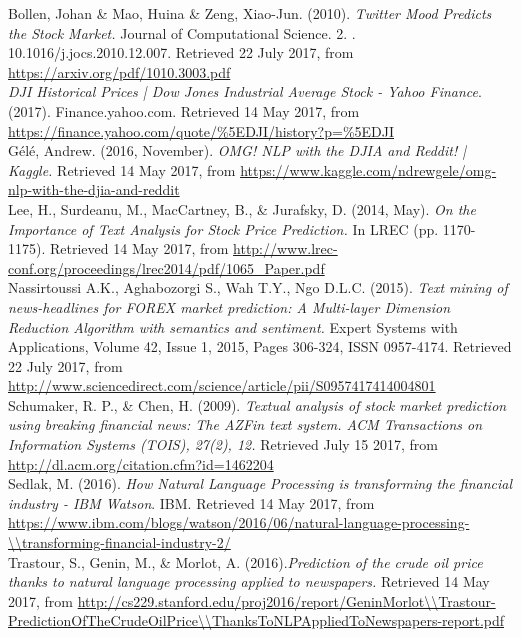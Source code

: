 \documentclass[11pt,a4paper]{article}
\begin{document}
Bollen, Johan \& Mao, Huina \& Zeng, Xiao-Jun. (2010). \textit{Twitter Mood Predicts the Stock Market.} Journal of Computational Science. 2. . 10.1016/j.jocs.2010.12.007. Retrieved 22 July 2017, from \url{https://arxiv.org/pdf/1010.3003.pdf}\\


\textit{DJI Historical Prices | Dow Jones Industrial Average Stock - Yahoo Finance}. (2017). Finance.yahoo.com. Retrieved 14 May 2017, from \url{https://finance.yahoo.com/quote/\%5EDJI/history?p=\%5EDJI}\\

G\'el\'e, Andrew. (2016, November). \textit{OMG! NLP with the DJIA and Reddit! | Kaggle.} Retrieved 14 May 2017, from \url{https://www.kaggle.com/ndrewgele/omg-nlp-with-the-djia-and-reddit}\\

Lee, H., Surdeanu, M., MacCartney, B., \& Jurafsky, D. (2014, May). \textit{On the Importance of Text Analysis for Stock Price Prediction.} In LREC (pp. 1170-1175). Retrieved 14 May 2017, from \url{http://www.lrec-conf.org/proceedings/lrec2014/pdf/1065_Paper.pdf}\\

Nassirtoussi A.K., Aghabozorgi S., Wah T.Y., Ngo D.L.C. (2015). \textit{Text mining of news-headlines for FOREX market prediction: A Multi-layer Dimension Reduction Algorithm with semantics and sentiment.} Expert Systems with Applications, Volume 42, Issue 1, 2015, Pages 306-324, ISSN 0957-4174. Retrieved 22 July 2017, from \url{http://www.sciencedirect.com/science/article/pii/S0957417414004801}\\

Schumaker, R. P., \& Chen, H. (2009). \textit{Textual analysis of stock market prediction using breaking financial news: The AZFin text system. ACM Transactions on Information Systems (TOIS), 27(2), 12.} Retrieved July 15 2017, from \url{http://dl.acm.org/citation.cfm?id=1462204}\\


Sedlak, M. (2016). \textit{How Natural Language Processing is transforming the financial industry - IBM Watson}. IBM. Retrieved 14 May 2017, from \url{https://www.ibm.com/blogs/watson/2016/06/natural-language-processing-\\transforming-financial-industry-2/}\\

Trastour, S., Genin, M., \& Morlot, A. (2016).\textit{Prediction of the crude oil price thanks to natural language processing applied to newspapers.} Retrieved 14 May 2017, from \url{http://cs229.stanford.edu/proj2016/report/GeninMorlot\\Trastour-PredictionOfTheCrudeOilPrice\\ThanksToNLPAppliedToNewspapers-report.pdf}\\
\end{document}
